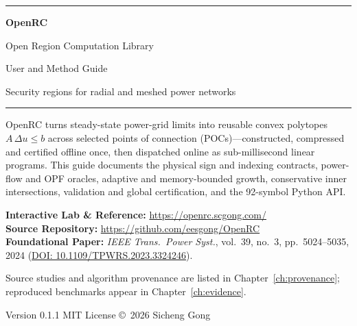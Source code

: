 \documentclass[11pt,a4paper]{report}
\begin{document}
\hypersetup{pageanchor=false}
\begin{titlepage}
\centering
\vspace*{2.2cm}
{\color{nboxide}\rule{3.2cm}{2.4pt}\par}
\vspace{1.0em}
{\Huge\bfseries\color{nbblue} OpenRC\par}
\vspace{0.55em}
{\LARGE Open Region Computation Library\par}
\vspace{1.8em}
{\Large User and Method Guide\par}
\vspace{0.9em}
{\large Security regions for radial and meshed power networks\par}
\vspace{1.6em}
{\color{coderule}\rule{0.82\textwidth}{0.6pt}\par}
\vfill
\begin{minipage}{0.82\textwidth}
\small
OpenRC turns steady-state power-grid limits into reusable convex polytopes
$A\,\Delta u \le b$ across selected points of connection (POCs)---constructed,
compressed and certified offline once, then dispatched online as sub-millisecond
linear programs. This guide documents the physical sign and indexing contracts,
power-flow and OPF oracles, adaptive and memory-bounded growth, conservative
inner intersections, validation and global certification, and the 92-symbol
Python API.

\medskip
\noindent\textbf{Interactive Lab \& Reference:} \url{https://openrc.scgong.com/}\\
\textbf{Source Repository:} \url{https://github.com/eesgong/OpenRC}\\
\textbf{Foundational Paper:} \emph{IEEE Trans.\ Power Syst.}, vol.~39, no.~3,
pp.~5024--5035, 2024 (\href{https://doi.org/10.1109/TPWRS.2023.3324246}{DOI: 10.1109/TPWRS.2023.3324246}).

\medskip
Source studies and algorithm provenance are listed in
Chapter~\ref{ch:provenance}; reproduced benchmarks appear in
Chapter~\ref{ch:evidence}.
\end{minipage}
\vfill
{\normalsize Version 0.1.1 \quad\textperiodcentered\quad MIT License
 \quad\textperiodcentered\quad \copyright\ 2026 Sicheng Gong\par}
\vspace{1cm}
\end{titlepage}
\hypersetup{pageanchor=true}

\tableofcontents
\end{document}
